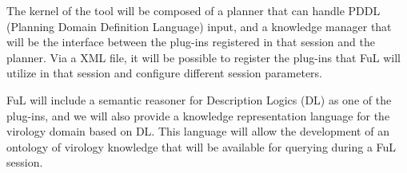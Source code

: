 \documentclass[portrait,final,a0paper,fontscale=0.277]{baposter}
\begin{document}
\begin{poster}
{{	The kernel of the tool will be composed of a planner that can
	handle PDDL (Planning Domain Definition Language) input, and a
	knowledge manager that will be the interface between the plug-ins
	registered in that session and the planner. Via a XML file, it
	will be possible to register the plug-ins that FuL will utilize
	in that session and configure different session parameters.
	
	FuL will include a semantic reasoner for Description Logics (DL)
	as one of the plug-ins, and we will also provide a knowledge
	representation language for the virology domain based on DL. This
	language will allow the development of an ontology of virology
	knowledge that will be available for querying during a FuL
	session.
	}
  }
\end{poster}
\end{document}
